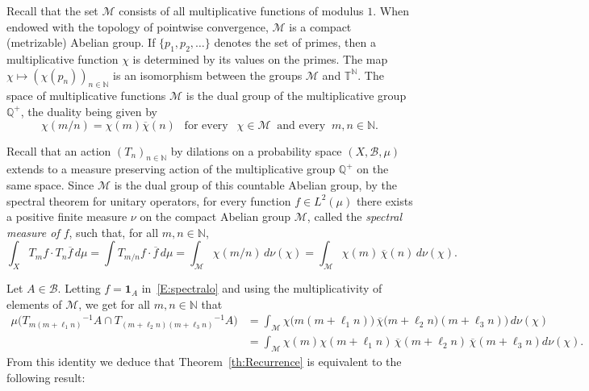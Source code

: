 \documentclass[11pt]{amsart}
\theoremstyle{definition}
\begin{document}
Recall that the set ${{\mathcal M}}$ consists of all multiplicative functions of modulus $1$. When endowed with the topology of
pointwise convergence, ${{\mathcal M}}$ is a compact (metrizable) Abelian
group. If  $\{p_1,p_2,\dots\}$ denotes the set of primes,  then a
multiplicative function $\chi$ is determined by its
values on the primes. The map $\chi\mapsto (\chi(p_n))_{n\in {{\mathbb N}}}$ is
an isomorphism between the groups ${{\mathcal M}}$ and ${{\mathbb T}}^{{\mathbb N}}$. The space of
multiplicative functions ${{\mathcal M}}$ is the dual group of the
multiplicative group ${{\mathbb Q}}^+$, the duality being given by
$$
\chi(m/n)=\chi(m)\overline\chi(n) \ \ \text{ for every }\ \ \chi\in{{\mathcal M}}
\ \text{ and every }\ m,n\in{{\mathbb N}}.
$$

Recall that an  action $(T_n)_{n\in{{\mathbb N}}}$ by dilations on a probability
space $(X,{{\mathcal B}},\mu)$ extends to a measure preserving action of the
multiplicative group ${{\mathbb Q}}^+$ on the same space. Since ${{\mathcal M}}$ is the
dual group of this countable Abelian group, by the spectral theorem
for unitary operators, for every function $f\in L^2(\mu)$ there
exists a positive finite
  measure $\nu$ on the compact Abelian group ${{\mathcal M}}$,  called the \emph{spectral measure of $f$}, such that, for all $m,n\in{{\mathbb N}}$,
\begin{equation}\label{E:spectralo}
\int_X T_mf\cdot T_n\overline f\,d\mu
=\int T_{m/n}f\cdot \overline f\,d\mu=\int_{{\mathcal M}}\chi(m/n)\,d\nu(\chi)
=\int_{{\mathcal M}}\chi(m)\, \overline\chi(n)\,d\nu(\chi).
\end{equation}

Let $A\in{{\mathcal B}}$. Letting $f={\mathbf{1}}_A$ in~\eqref{E:spectralo} and using
the multiplicativity of elements of ${{\mathcal M}}$, we get for all
$m,n\in{{\mathbb N}}$ that
\begin{align*}\label{eq:spectral}
  \mu\big(T_{m(m+\ell_1n)}{^{-1}} A\cap
T_{(m+\ell_2n)(m+\ell_3n)}{^{-1}} A\big)&=\int_{{\mathcal M}}
\chi\big(m(m+\ell_1n)\big)\,\overline\chi\big(m+\ell_2n)(m+\ell_3n)\big)\,d\nu(\chi)\\
&=\int_{{\mathcal M}}
\chi(m)\chi(m+\ell_1n)\,\overline\chi(m+\ell_2n)\,\overline\chi(m+\ell_3n)d\nu(\chi).
\end{align*}
 From this identity we deduce   that Theorem~\ref{th:Recurrence} is equivalent to the following result:
\end{document}
